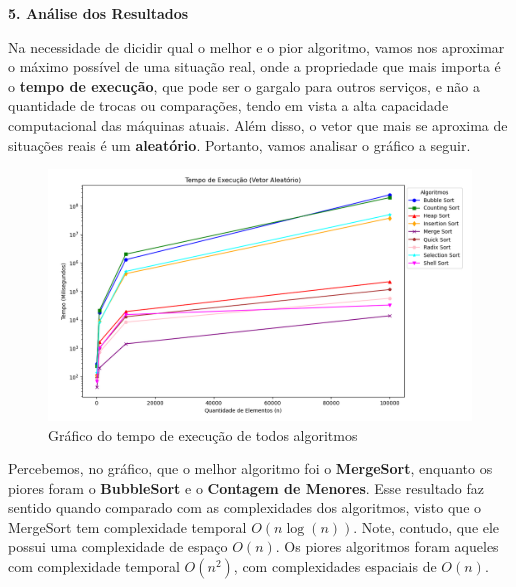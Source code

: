 \documentclass[10pt]{article}
\begin{document}
\vspace{0.25cm}

\textbf{5. Análise dos Resultados}

Na necessidade de dicidir qual o melhor e o pior algoritmo, vamos nos aproximar o máximo possível de uma situação real, onde a propriedade que mais importa é o \textbf{tempo de execução}, que pode ser o gargalo para outros serviços, e não a quantidade de trocas ou comparações, tendo em vista a alta capacidade computacional das máquinas atuais. Além disso, o vetor que mais se aproxima de situações reais é um \textbf{aleatório}. Portanto, vamos analisar o gráfico a seguir.

\begin{figure}[H]
  \centering
  \includegraphics[width=1\textwidth]{TempoExecGeralAleat2.png}
  \caption{Gráfico do tempo de execução de todos algoritmos}
  \label{fig:4}
\end{figure}

Percebemos, no gráfico, que o melhor algoritmo foi o \textbf{MergeSort}, enquanto os piores foram o \textbf{BubbleSort} e o \textbf{Contagem de Menores}. Esse resultado faz sentido quando comparado com as complexidades dos algoritmos, visto que o MergeSort tem complexidade temporal $O(n \log(n))$. Note, contudo, que ele possui uma complexidade de espaço $O(n)$. Os piores algoritmos foram aqueles com complexidade temporal $O(n^2)$, com complexidades espaciais de $O(n)$.

\vspace{0.25cm}
\end{document}
